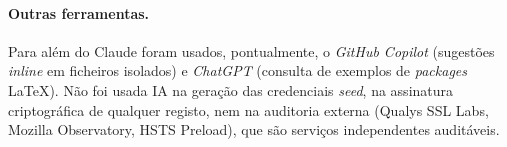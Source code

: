 \documentclass[a4paper,11pt]{article}
\begin{document}
\paragraph{Outras ferramentas.} Para além do Claude foram usados,
pontualmente, o \emph{GitHub Copilot} (sugestões \emph{inline} em
ficheiros isolados) e \emph{ChatGPT} (consulta de exemplos de
\emph{packages} LaTeX). Não foi usada IA na geração das credenciais
\emph{seed}, na assinatura criptográfica de qualquer registo, nem na
auditoria externa (Qualys SSL Labs, Mozilla Observatory, HSTS Preload),
que são serviços independentes auditáveis.

\nocite{*}  %

\end{document}
